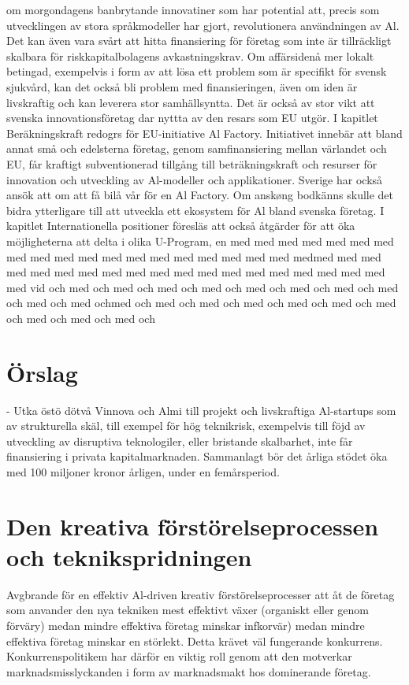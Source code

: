 {{{{{{{{{{{{{{om morgondagens banbrytande innovatiner som har potential att, precis som utvecklingen av stora språkmodeller har gjort, revolutionera användningen av Al. Det kan även vara svårt att hitta finansiering för företag som inte är tillräckligt skalbara för riskkapitalbolagens avkastningskrav. Om affärsidenå mer lokalt betingad, exempelvis i form av att lösa ett problem som är specifikt för svensk sjukvård, kan det också bli problem med finansieringen, även om iden är livskraftig och kan leverera stor samhällsyntta.
Det är också av stor vikt att svenska innovationsföretag dar nyttta av den resars som EU utgör. I kapitlet Beräkningskraft redogrs för EU-initiative Al Factory. Initiativet innebär att bland annat små och edelsterna företag, genom samfinansiering mellan värlandet och EU, får kraftigt subventionerad tillgång till beträkningskraft och resurser för innovation och utveckling av Al-modeller och applikationer. Sverige har också ansök att om att få bilå vår för en Al Factory. Om anskøng bodkänns skulle det bidra ytterligare till att utveckla ett ekosystem för Al bland svenska företag. I kapitlet Internationella positioner föresläs att också åtgärder för att öka möjligheterna att delta i olika U-Program, en med med med med med med med med med med med med med med med med med med med medmed med med med med med med med med med med med med med med med med med med med vid och med och med och med och med och med och med och med och med och med och med ochmed och med och med och med och med och med och med och med och med och med och
\section*{Örslag}
- Utka östö dötvå Vinnova och Almi till projekt och livskraftiga Al-startups som av strukturella skäl, till exempel för hög teknikrisk, exempelvis till föjd av utveckling av disruptiva teknologiler, eller bristande skalbarhet, inte får finansiering i privata kapitalmarknaden. Sammanlagt bör det årliga stödet öka med 100 miljoner kronor årligen, under en femårsperiod.
\section*{Den kreativa förstörelseprocessen och teknikspridningen}
Avgbrande för en effektiv Al-driven kreativ förstörelseprocesser att åt de företag som anvander den nya tekniken mest effektivt växer (organiskt eller genom förväry) medan mindre effektiva företag minskar infkorvär) medan mindre effektiva företag minskar en störlekt. Detta krävet väl fungerande konkurrens. Konkurrenspolitikem har därför en viktig roll genom att den motverkar marknadsmisslyckanden i form av marknadsmakt hos dominerande företag.

}}}}}}}}}}}}}}
